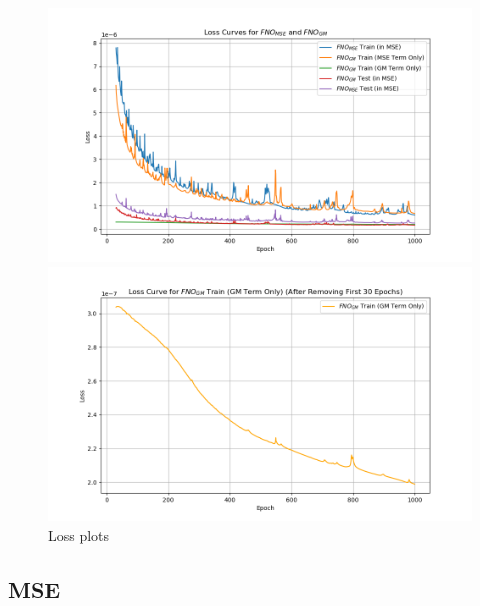 \documentclass[
]{article}
\begin{document}
\begin{figure}

\begin{minipage}{0.50\linewidth}

\includegraphics[width=1\textwidth,height=\textheight]{../../test/all_loss.png}

\end{minipage}%
%
\begin{minipage}{0.50\linewidth}

\includegraphics[width=1\textwidth,height=\textheight]{../../test/GM_term.png}

\end{minipage}%

\caption{\label{fig-loss}Loss plots}

\end{figure}%

\subsection{MSE}\label{mse}
\end{document}

